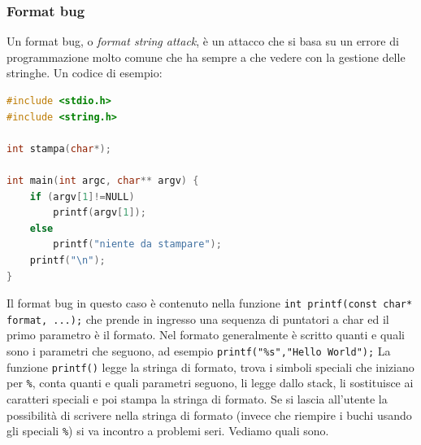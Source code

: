 \subsubsection{Format bug}
Un format bug, o \textit{format string attack}, è un attacco che si basa su un errore di programmazione molto comune che ha sempre a che vedere con la gestione delle stringhe. Un codice di esempio:
\begin{lstlisting}[language=C]
#include <stdio.h>
#include <string.h>

int stampa(char*);

int main(int argc, char** argv) {
	if (argv[1]!=NULL)
		printf(argv[1]);
	else
		printf("niente da stampare");
	printf("\n");
}
\end{lstlisting}
Il format bug in questo caso è contenuto nella funzione \texttt{int printf(const char* format, ...);} che prende in ingresso una sequenza di puntatori a char ed il primo parametro è il formato. Nel formato generalmente è scritto quanti e quali sono i parametri che seguono, ad esempio \texttt{printf("\%s","Hello World");} La funzione \texttt{printf()} legge la stringa di formato, trova i simboli speciali che iniziano per \texttt{\%}, conta quanti e quali parametri seguono, li legge dallo stack, li sostituisce ai caratteri speciali e poi stampa la stringa di formato. Se si lascia all’utente la possibilità di scrivere nella stringa di formato (invece che riempire i buchi usando gli speciali \texttt{\%}) si va incontro a problemi seri. Vediamo quali sono.\\

